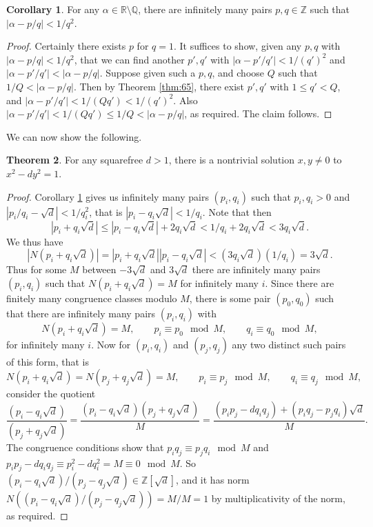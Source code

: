\documentclass{article}
\newcommand{\Z}{\mathbb{Z}}
\newcommand{\Q}{\mathbb{Q}}
\newcommand{\R}{\mathbb{R}}
\newcommand{\rb}[1]{\left( #1 \right)}
\renewcommand{\sb}[1]{\left[ #1 \right]}
\newcommand{\abs}[1]{\left\lvert #1 \right\rvert}
\theoremstyle{definition}\newtheorem{definition}{Definition}
\theoremstyle{definition}\newtheorem{remark}[definition]{Remark}
\theoremstyle{definition}\newtheorem*{example}{Example}
\theoremstyle{definition}\newtheorem*{note}{Note}
\newtheorem{theorem}[definition]{Theorem}
\newtheorem{corollary}[definition]{Corollary}
\begin{document}
\begin{corollary}
\label{cor:66}
For any $ \alpha \in \R \setminus \Q $, there are infinitely many pairs $ p, q \in \Z $ such that $ \abs{\alpha - p / q} < 1 / q^2 $.
\end{corollary}

\begin{proof}
Certainly there exists $ p $ for $ q = 1 $. It suffices to show, given any $ p, q $ with $ \abs{\alpha - p / q} < 1 / q^2 $, that we can find another $ p', q' $ with $ \abs{\alpha - p' / q'} < 1 / \rb{q'}^2 $ and $ \abs{\alpha - p' / q'} < \abs{\alpha - p / q} $. Suppose given such a $ p, q $, and choose $ Q $ such that $ 1 / Q < \abs{\alpha - p / q} $. Then by Theorem \ref{thm:65}, there exist $ p', q' $ with $ 1 \le q' < Q $, and $ \abs{\alpha - p' / q'} < 1 / \rb{Qq'} < 1 / \rb{q'}^2 $. Also $ \abs{\alpha - p' / q'} < 1 / \rb{Qq'} \le 1 / Q < \abs{\alpha - p / q} $, as required. The claim follows.
\end{proof}

We can now show the following.

\begin{theorem}
For any squarefree $ d > 1 $, there is a nontrivial solution $ x, y \ne 0 $ to $ x^2 - dy^2 = 1 $.
\end{theorem}

\begin{proof}
Corollary \ref{cor:66} gives us infinitely many pairs $ \rb{p_i, q_i} $ such that $ p_i, q_i > 0 $ and $ \abs{p_i / q_i - \sqrt{d}} < 1 / q_i^2 $, that is $ \abs{p_i - q_i\sqrt{d}} < 1 / q_i $. Note that then
$$ \abs{p_i + q_i\sqrt{d}} \le \abs{p_i - q_i\sqrt{d}} + 2q_i\sqrt{d} < 1 / q_i + 2q_i\sqrt{d} < 3q_i\sqrt{d}. $$
We thus have
$$ \abs{N\rb{p_i + q_i\sqrt{d}}} = \abs{p_i + q_i\sqrt{d}}\abs{p_i - q_i\sqrt{d}} < \rb{3q_i\sqrt{d}}\rb{1 / q_i} = 3\sqrt{d}. $$
Thus for some $ M $ between $ -3\sqrt{d} $ and $ 3\sqrt{d} $ there are infinitely many pairs $ \rb{p_i, q_i} $ such that $ N\rb{p_i + q_i\sqrt{d}} = M $ for infinitely many $ i $. Since there are finitely many congruence classes modulo $ M $, there is some pair $ \rb{p_0, q_0} $ such that there are infinitely many pairs $ \rb{p_i, q_i} $ with
$$ N\rb{p_i + q_i\sqrt{d}} = M, \qquad p_i \equiv p_0 \mod M, \qquad q_i \equiv q_0 \mod M, $$
for infinitely many $ i $. Now for $ \rb{p_i, q_i} $ and $ \rb{p_j, q_j} $ any two distinct such pairs of this form, that is
$$ N\rb{p_i + q_i\sqrt{d}} = N\rb{p_j + q_j\sqrt{d}} = M, \qquad p_i \equiv p_j \mod M, \qquad q_i \equiv q_j \mod M, $$
consider the quotient
$$ \dfrac{\rb{p_i - q_i\sqrt{d}}}{\rb{p_j + q_j\sqrt{d}}} = \dfrac{\rb{p_i - q_i\sqrt{d}}\rb{p_j + q_j\sqrt{d}}}{M} = \dfrac{\rb{p_ip_j - dq_iq_j} + \rb{p_iq_j - p_jq_i}\sqrt{d}}{M}. $$
The congruence conditions show that $ p_iq_j \equiv p_jq_i \mod M $ and $ p_ip_j - dq_iq_j \equiv p_i^2 - dq_i^2 = M \equiv 0 \mod M $. So $ \rb{p_i - q_i\sqrt{d}} / \rb{p_j - q_j\sqrt{d}} \in \Z\sb{\sqrt{d}} $, and it has norm $ N\rb{\rb{p_i - q_i\sqrt{d}} / \rb{p_j - q_j\sqrt{d}}} = M / M = 1 $ by multiplicativity of the norm, as required.
\end{proof}
\end{document}
